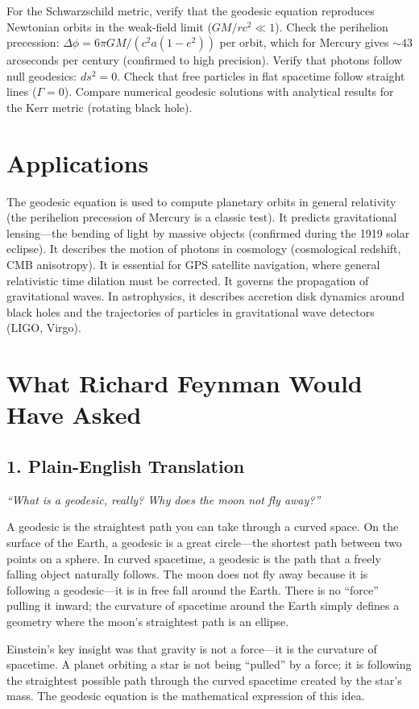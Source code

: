 For the Schwarzschild metric, verify that the geodesic equation reproduces Newtonian orbits in the weak-field limit ($GM/rc^2 \ll 1$). Check the perihelion precession: $\Delta\phi = 6\pi GM/(c^2 a(1-e^2))$ per orbit, which for Mercury gives $\sim 43$ arcseconds per century (confirmed to high precision). Verify that photons follow null geodesics: $ds^2 = 0$. Check that free particles in flat spacetime follow straight lines ($\Gamma = 0$). Compare numerical geodesic solutions with analytical results for the Kerr metric (rotating black hole).
\section*{Applications}

The geodesic equation is used to compute planetary orbits in general relativity (the perihelion precession of Mercury is a classic test). It predicts gravitational lensing---the bending of light by massive objects (confirmed during the 1919 solar eclipse). It describes the motion of photons in cosmology (cosmological redshift, CMB anisotropy). It is essential for GPS satellite navigation, where general relativistic time dilation must be corrected. It governs the propagation of gravitational waves. In astrophysics, it describes accretion disk dynamics around black holes and the trajectories of particles in gravitational wave detectors (LIGO, Virgo).
\section*{What Richard Feynman Would Have Asked}

\subsection*{1. Plain-English Translation}
\textit{``What is a geodesic, really? Why does the moon not fly away?''}

A geodesic is the straightest path you can take through a curved space. On the surface of the Earth, a geodesic is a great circle---the shortest path between two points on a sphere. In curved spacetime, a geodesic is the path that a freely falling object naturally follows. The moon does not fly away because it is following a geodesic---it is in free fall around the Earth. There is no ``force'' pulling it inward; the curvature of spacetime around the Earth simply defines a geometry where the moon's straightest path is an ellipse.

Einstein's key insight was that gravity is not a force---it is the curvature of spacetime. A planet orbiting a star is not being ``pulled'' by a force; it is following the straightest possible path through the curved spacetime created by the star's mass. The geodesic equation is the mathematical expression of this idea.

